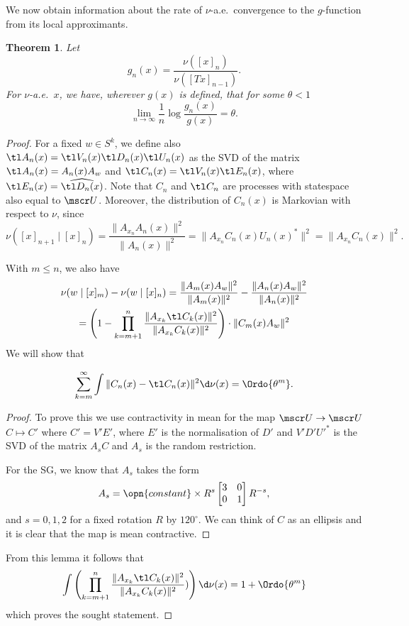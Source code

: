 \documentclass[11pt]{scrartcl}
\theoremstyle{plain} %
\newtheorem{thm}{Theorem}%
\theoremstyle{definition}
\begin{document}
We now obtain information about the rate of $\nu$-a.e.\ convergence to the $g$-function from
its local approximants.
\begin{thm}
Let
$$g_n (x)=\frac{\nu([x]_n)}{\nu([Tx]_{n-1})}.$$
For $\nu$-a.e.\ $x$, we have, wherever $g(x)$ is defined, that for some $\theta<1$
$$\lim_{n\to \infty} \frac{1}{n} \log \frac{g_n(x)}{g(x)}=\theta.$$
\end{thm}

\begin{proof}
For a fixed $w\in S^k$, we define also
 $\tl A_n(x) = \tl V_n(x) \tl D_n(x) \tl U_n(x)$ as the SVD
of the matrix $\tl A_n(x)= A_n(x) A_w$ and $\tl C_n(x)=\tl V_n(x) \tl
E_n(x)$, where $\tl E_n(x) = \widehat{\tl D_n(x)}$. 
Note that $C_n$ and $\tl C_n$ are processes
with statespace also equal to $\mscr U$. Moreover, the distribution of
$C_n(x)$ is Markovian with respect to $\nu$, since 
$$ 
\nu([x]_{n+1}\mid [x]_n) = 
\frac{\| A_{x_n} A_n(x) \|^2}{\| A_n(x) \|^2} 
= \| A_{x_n} C_n(x) U_n(x)^* \|^2
= \| A_{x_n} C_n(x) \|^2.
$$

With $m\leq n$, we also have 
\begin{multline*}
 \nu(w\mid [x]_m) - \nu(w\mid [x]_n) = 
 \frac{\| A_m(x) A_w \|^2}{\| A_m(x) \|^2} - \frac{\| A_n(x) A_w
   \|^2}{\| A_n(x) \|^2} \\
 =
 \left(1 - \prod_{k=m+1}^n \frac{\| A_{x_k} \tl C_k(x) \|^2}{\| A_{x_k} C_k(x) \|^2}\right)
 \cdot \| C_m(x) A_w \|^2
\end{multline*}
We will show that 
\begin{lemma}
$$ \sum_{k=m}^\infty \int \|C_n(x)-\tl C_n(x)\|^2 \d\nu(x) = \Ordo{\theta^m}. $$ 
\end{lemma}
\begin{proof}
  To prove this we use contractivity in mean for the map $\mscr
  U\to\mscr U$ $C \mapsto C'$ where $C'=V'E'$, where $E'$ is the
  normalisation of $D'$ and $V'D'{U'}^*$ is the SVD of the matrix $A_s
  C$ and $A_s$ is the random restriction.
  
  For the SG, we know that $A_s$ takes the form 
  $$ A_s = \opn{constant}\times R^s \begin{bmatrix} 3&0\\ 0&1 \end{bmatrix} R^{-s}, $$
  and $s=0,1,2$ for a fixed rotation $R$ by $120^\circ$. We can think
  of $C$ as an ellipsis and it is clear that the map is mean contractive. 
\end{proof}
From this lemma it follows that
$$
 \int \left(\prod_{k=m+1}^n \frac{\| A_{x_k} \tl C_k(x) \|^2}{\| A_{x_k} C_k(x)
   \|^2})\right)\d\nu(x) = 1+\Ordo{\theta^m}
$$
which proves the sought statement. 

\end{proof}
\end{document}
